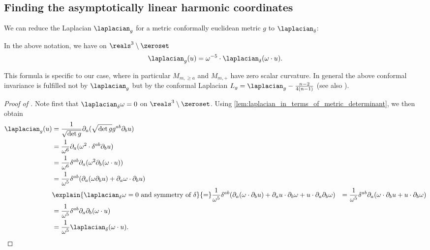 \documentclass[titlepage,numbers=noenddot,headinclude,oneside,%
footinclude=true,cleardoublepage=empty,%
BCOR=5mm,paper=a4,fontsize=11pt,%
english,%
]{scrartcl}
\begin{document}
\subsection{Finding the asymptotically linear harmonic coordinates}


We can reduce the Laplacian \( \laplacian_g \) for a metric conformally euclidean metric \( g \) to \( \laplacian_{\delta} \):
\begin{lemma}\label{lem:laplacian_on_schwarzschild}
    In the above notation, we have on \( \reals^3\setminus \zeroset \)
    \begin{equation*}
        \laplacian_g(u)=\omega^{-5}\cdot \laplacian_\delta(\omega \cdot u).
    \end{equation*}
\end{lemma}
\begin{remark}
    This formula is specific to our case, where in particular \( M_{m,\geq a} \) and \( M_{m,+} \) have zero scalar curvature. In general the above conformal invariance is fulfilled not by \( \laplacian_g \) but by the conformal Laplacian \( L_g=\laplacian_g-\frac{n-2}{4(n-1)} \) (see also \cite[Definition 3]{curryIntroductionConformalGeometry2015}).
\end{remark}
\begin{proof}[Proof of ]
    Note first that \( \laplacian_\delta \omega=0 \) on \( \reals^3\setminus \zeroset \). Using \cref{lem:laplacian_in_terms_of_metric_determinant}, we then obtain
    \begin{equation*}
        \begin{aligned}[t]
            \laplacian_g(u)\begin{aligned}[t]
                &=\frac{1}{\sqrt{\det{g}}}\partial_a(\sqrt{\det{g}}g^{ab}\partial_b u)\\
                &=\frac{1}{\omega^6}\partial_a(\omega^{2}\cdot \delta^{ab} \partial_b u)\\
                &=\frac{1}{\omega^6}\delta^{ab}\partial_a(\omega^2 \partial_b(\omega\cdot u))\\
                &=\frac{1}{\omega^5}\delta^{ab}(\partial_a(\omega \partial_b u)+\partial_a \omega\cdot \partial_b u)\\
                &\explain{\text{\( \laplacian_\delta \omega=0 \) and symmetry of \( \delta \)}}{=}\frac{1}{\omega^5}\delta^{ab}(\partial_a(\omega\cdot \partial_b u)+\partial_a u\cdot \partial_b \omega+u\cdot \partial_a \partial_b \omega)
                &=\frac{1}{\omega^5}\delta^{ab}\partial_a(\omega\cdot \partial_b u +u\cdot \partial_b \omega)\\
                &=\frac{1}{\omega^5}\delta^{ab}\partial_a  \partial_b(\omega\cdot u)\\
                &=\frac{1}{\omega^5}\laplacian_\delta(\omega\cdot u).
            \end{aligned}
        \end{aligned}
    \end{equation*}
\end{proof}
\end{document}
